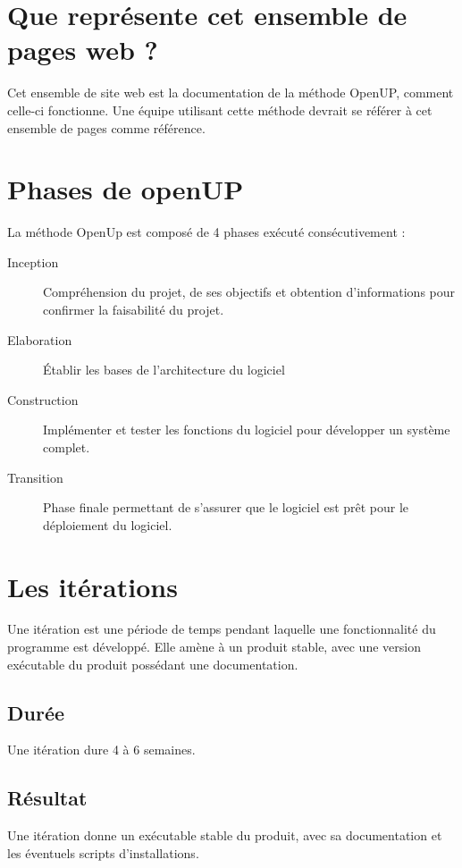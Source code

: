\documentclass[a4paper, 11pt]{article}
\begin{document}
	\maketitle
	\section{Que représente cet ensemble de pages web ?}
	Cet ensemble de site web est la documentation de la méthode OpenUP, comment celle-ci fonctionne. Une équipe utilisant cette méthode devrait se
	référer à cet ensemble de pages comme référence.
	
	\section{Phases de openUP} 
	La méthode OpenUp est composé de 4 phases exécuté consécutivement : 
	\begin{description}
		\item[Inception] Compréhension du projet, de ses objectifs et obtention
			d'informations pour confirmer la faisabilité du
			projet.
		\item[Elaboration] Établir les bases de l'architecture du logiciel
		\item[Construction] Implémenter et tester les fonctions du logiciel pour développer un système complet. 
		\item[Transition] Phase finale permettant de s'assurer que le logiciel est prêt pour le déploiement du logiciel. 
	\end{description}

\section{Les itérations}
Une itération est une période de temps pendant laquelle une fonctionnalité du programme est développé. 
Elle amène à un produit stable, avec une version exécutable du produit possédant une documentation.

\subsection{Durée}
Une itération dure 4 à 6 semaines.

\subsection{Résultat}
Une itération donne un exécutable stable du produit, avec sa documentation et les éventuels scripts d'installations.
	
\end{document}
